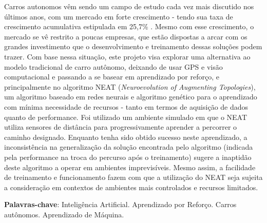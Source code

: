 \setlength{\absparsep}{18pt} %
\begin{resumo}
	Carros autonomos v{\^e}m sendo um campo de estudo cada vez mais discutido
	nos {\'u}ltimos anos, com um mercado em forte crescimento - tendo sua taxa
	de crescimento acumulativa estipulada em 25,7\% \cite{globe2022}. Mesmo com
	esse crescimento, o mercado se v{\^e} restrito a poucas empresas, que
	est{\~a}o dispostas a arcar com os grandes investimento que o
	desenvolvimento e treinamento dessas solu{\c c}{\~o}es podem trazer. Com
	base nessa situa{\c c}{\~a}o, este projeto visa explorar uma alternativa ao
	modelo tradicional de carro aut{\^o}nomo, deixando de usar GPS e vis{\~a}o
	computacional e passando a se basear em aprendizado por refor{\c c}o, e
	principalmente no algoritmo NEAT (\textit{Neuroevolution of Augmenting
	Topologies}), um algoritmo baseado em redes neurais e algoritmo
	gen{\'e}tico para o aprendizado com m{\'i}nima necessidade de recursos -
	tanto em termos de aquisi{\c c}{\~a}o de dados quanto de performance. Foi
	utilizado um ambiente simulado em que o NEAT utiliza sensores de
	dist{\^a}ncia para progressivamente aprender a percorrer o caminho
	designado. Enquanto tenha sido obtido sucesso neste aprendizado, a
	inconsist{\^e}ncia na generaliza{\c c}{\~a}o da solu{\c c}{\~a}o encontrada
	pelo algoritmo (indicada pela performance na troca do percurso ap{\'o}s o
	treinamento) sugere a inaptid{\~a}o deste algoritmo a operar em ambientes
	imprevis{\'i}veis. Mesmo assim, a facilidade de treinamento e funcionamento
	fazem com que a utiliza{\c c}{\~a}o do NEAT seja sujeita a considera{\c
	c}{\~a}o em contextos de ambientes mais controlados e recursos limitados.

	\textbf{Palavras-chave}: Intelig{\^e}ncia Artificial. Aprendizado por Refor{\c c}o. Carros aut{\^o}nomos. Aprendizado de M{\'a}quina.
\end{resumo}

